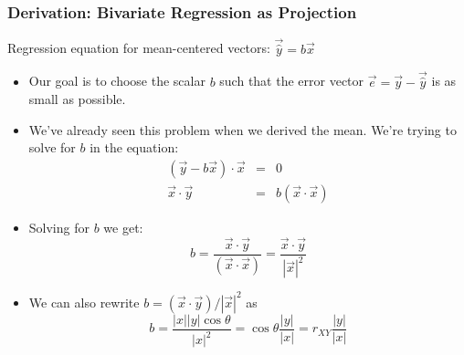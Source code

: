 \documentclass{beamer}
\begin{document}
\begin{frame}[allowframebreaks]
  \frametitle{Derivation: Bivariate Regression as Projection}

Regression equation for mean-centered vectors: $\vec{\widehat{y}} = b\vec{x}$

\begin{itemize}
\item Our goal is to choose the scalar $b$ such that the error vector $\vec{e} = \vec{y} - \vec{\widehat{y}}$ is as small as possible.

\item We've already seen this problem when we derived the mean. We're trying to solve for $b$ in the equation:
%
\begin{eqnarray*}
(\vec{y} - b\vec{x}) \cdot \vec{x} &=& 0 \\
\vec{x} \cdot \vec{y} &=& b(\vec{x} \cdot \vec{x}) 
\end{eqnarray*}

\item Solving for $b$ we get:
%
\[
b = \frac{\vec{x} \cdot \vec{y}}{(\vec{x} \cdot \vec{x})} = \frac{\vec{x} \cdot \vec{y}}{|\vec{x}|^2}
\]
  
\item We can also rewrite $b = (\vec{x} \cdot \vec{y})/|\vec{x}|^2$ as
%
\[
b = \frac{|x||y| \cos \theta}{|x|^2} 
  = \cos \theta \frac{|y|}{|x|} 
  = r_{XY} \frac{|y|}{|x|}
\]

\end{itemize}  


\end{frame}
\end{document}
